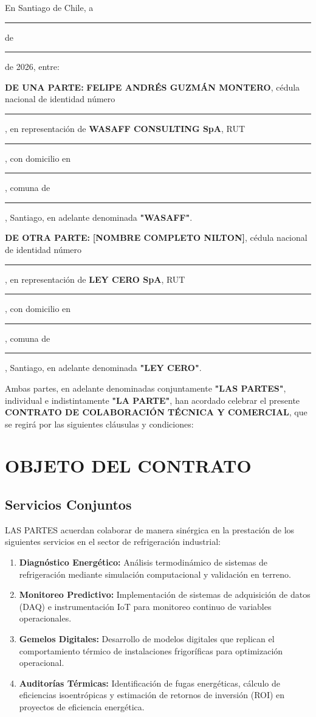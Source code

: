 \documentclass[11pt,letterpaper]{article}
\begin{document}
En Santiago de Chile, a \rule{2cm}{0.15mm} de \rule{3cm}{0.15mm} de 2026, entre:

\vspace{0.5cm}

\textbf{DE UNA PARTE:} \textbf{FELIPE ANDRÉS GUZMÁN MONTERO}, cédula nacional de identidad número \rule{3cm}{0.15mm}, en representación de \textbf{WASAFF CONSULTING SpA}, RUT \rule{3cm}{0.15mm}, con domicilio en \rule{6cm}{0.15mm}, comuna de \rule{4cm}{0.15mm}, Santiago, en adelante denominada \textbf{"WASAFF"}.

\vspace{0.3cm}

\textbf{DE OTRA PARTE:} \textbf{[NOMBRE COMPLETO NILTON]}, cédula nacional de identidad número \rule{3cm}{0.15mm}, en representación de \textbf{LEY CERO SpA}, RUT \rule{3cm}{0.15mm}, con domicilio en \rule{6cm}{0.15mm}, comuna de \rule{4cm}{0.15mm}, Santiago, en adelante denominada \textbf{"LEY CERO"}.

\vspace{0.3cm}

Ambas partes, en adelante denominadas conjuntamente \textbf{"LAS PARTES"}, individual e indistintamente \textbf{"LA PARTE"}, han acordado celebrar el presente \textbf{CONTRATO DE COLABORACIÓN TÉCNICA Y COMERCIAL}, que se regirá por las siguientes cláusulas y condiciones:


\section{OBJETO DEL CONTRATO}

\subsection{Servicios Conjuntos}

LAS PARTES acuerdan colaborar de manera sinérgica en la prestación de los siguientes servicios en el sector de refrigeración industrial:

\begin{enumerate}[label=\alph*)]
    \item \textbf{Diagnóstico Energético:} Análisis termodinámico de sistemas de refrigeración mediante simulación computacional y validación en terreno.
    
    \item \textbf{Monitoreo Predictivo:} Implementación de sistemas de adquisición de datos (DAQ) e instrumentación IoT para monitoreo continuo de variables operacionales.
    
    \item \textbf{Gemelos Digitales:} Desarrollo de modelos digitales que replican el comportamiento térmico de instalaciones frigoríficas para optimización operacional.
    
    \item \textbf{Auditorías Térmicas:} Identificación de fugas energéticas, cálculo de eficiencias isoentrópicas y estimación de retornos de inversión (ROI) en proyectos de eficiencia energética.
\end{enumerate}
\end{document}
